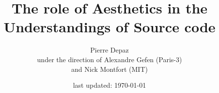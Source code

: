 \documentclass{book}
\begin{document}
\title{The role of Aesthetics in the Understandings of Source code}
\author{Pierre Depaz\\under the direction of Alexandre Gefen (Paris-3)\\and Nick Montfort (MIT)}
\date{last updated: \today}
\maketitle



\pagebreak



\pagebreak



\pagebreak



\pagebreak



\pagebreak






\end{document}

